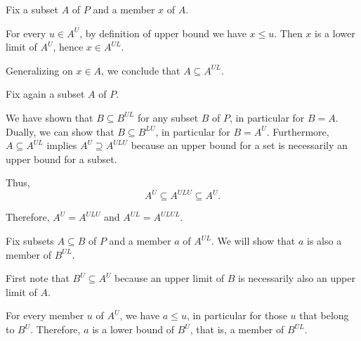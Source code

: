 \begin{defproof}
   Fix a subset \( A \) of \( P \) and a member \( x \) of \( A \).

  For every \( u \in A^U \), by definition of upper bound we have \( x \leq u \). Then \( x \) is a lower limit of \( A^U \), hence \( x \in A^{UL} \).

  Generalizing on \( x \in A \), we conclude that \( A \subseteq A^{UL} \).

   Fix again a subset \( A \) of \( P \).

  We have shown that \( B \subseteq B^{UL} \) for any subset \( B \) of \( P \), in particular for \( B = A \). Dually, we can show that \( B \subseteq B^{LU} \), in particular for \( B = A^U \). Furthermore, \( A \subseteq A^{UL} \) implies \( A^U \supseteq A^{ULU} \) because an upper bound for a set is necessarily an upper bound for a subset.

  Thus,
  \begin{equation*}
    A^U \subseteq A^{ULU} \subseteq A^U.
  \end{equation*}

  Therefore, \( A^U = A^{ULU} \) and \( A^{UL} = A^{ULUL} \).

   Fix subsets \( A \subseteq B \) of \( P \) and a member \( a \) of \( A^{UL} \). We will show that \( a \) is also a member of \( B^{UL} \).

  First note that \( B^U \subseteq A^U \) because an upper limit of \( B \) is necessarily also an upper limit of \( A \).

  For every member \( u \) of \( A^U \), we have \( a \leq u \), in particular for those \( u \) that belong to \( B^U \). Therefore, \( a \) is a lower bound of \( B^U \), that is, a member of \( B^{UL} \).
\end{defproof}

